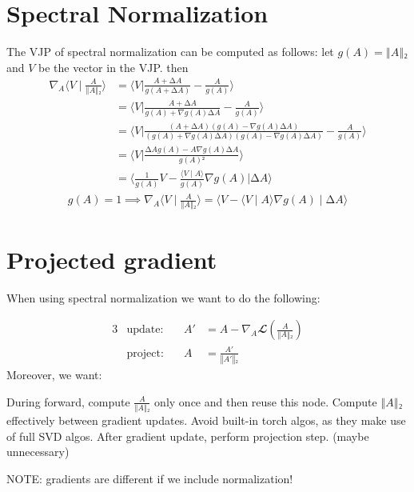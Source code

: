 \documentclass[10pt]{article}
\begin{document}
\section{Spectral Normalization}
The VJP of spectral normalization can be computed as follows: let $g(A) = ‖A‖₂$ and $V$ be the vector in the VJP. then
%
\begin{align*}%
∇_A⟨V ∣ \frac{A}{‖A‖₂}⟩
	&= ⟨V | \frac{A+∆A}{g(A+∆A)} - \frac{A}{g(A)}⟩
\\  &= ⟨V | \frac{A+∆A}{g(A)+∇g(A)∆A} - \frac{A}{g(A)}⟩
\\  &= ⟨V | \frac{(A+∆A)(g(A)-∇g(A)∆A)}{(g(A)+∇g(A)∆A)(g(A) - ∇g(A)∆A)} - \frac{A}{g(A)}⟩
\\  &= ⟨V | \frac{ ∆Ag(A)- A∇g(A)∆A}{g(A)²}⟩
\\  &= ⟨\tfrac{1}{g(A)}V - \tfrac{⟨V∣A⟩}{g(A)}∇g(A) | ∆A⟩
\end{align*}%
%
%
\begin{align*}%
g(A)=1 ⟹ ∇_A⟨V ∣ \frac{A}{‖A‖₂}⟩ = ⟨V - ⟨V∣A⟩∇g(A)∣∆A⟩%
\end{align*}%
%

\section{Projected gradient}

When using spectral normalization we want to do the following:

%
\begin{alignat*}{3}%
   &\text{update:}\quad& A' &= A - ∇_A 𝓛(\frac{A}{‖A‖₂})%
\\ &\text{project:}\quad& A &= \frac{A'}{‖A'‖₂}
\end{alignat*}%
%
Moreover, we want:
%
\begin{outline}%
\1 During forward, compute $\frac{A}{‖A‖₂}$ only once and then reuse this node.
\1 Compute $‖A‖₂$ effectively between gradient updates.
	\2 Avoid built-in torch algos, as they make use of full SVD algos.
\1 After gradient update, perform projection step. (maybe unnecessary)
\end{outline}%
%
NOTE: gradients are different if we include normalization!
\end{document}
